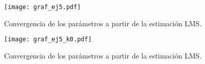 

	
	



	\begin{figure}[h!]
		\centering
		\texttt{[image: graf\_ej5.pdf]}
		\caption{Convergencia de los parámetros a partir de la estimación LMS.}
		\label{fig:ej3}
	\end{figure}


	\begin{figure}[h!]
		\centering
		\texttt{[image: graf\_ej5\_k0.pdf]}
		\caption{Convergencia de los parámetros a partir de la estimación LMS.}
		\label{fig:ej3}
	\end{figure}


